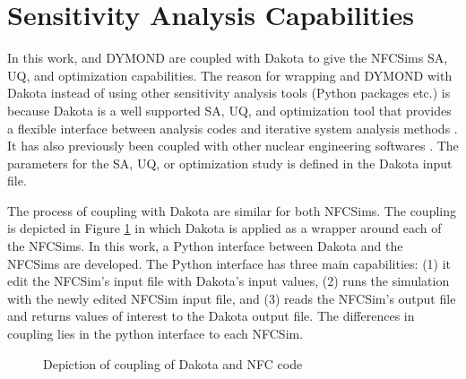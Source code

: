 \section{Sensitivity Analysis Capabilities}
In this work, \Cyclus and DYMOND are coupled with Dakota 
\cite{eldred_dakota_2010} to give the \glspl{NFCSim} \gls{SA}, 
\gls{UQ}, and optimization capabilities. 
The reason for wrapping \Cyclus and DYMOND with Dakota instead of 
using other sensitivity analysis tools (Python packages etc.)
is because Dakota is a well supported \gls{SA}, \gls{UQ}, 
and optimization tool that provides a flexible interface between 
analysis codes and iterative system analysis methods 
\cite{turner_virtual_nodate}. 
It has also previously been coupled with other nuclear engineering 
softwares \cite{turner_virtual_nodate,zhang_uncertainty_nodate}. 
The parameters for the \gls{SA}, \gls{UQ}, or optimization study is defined 
in the Dakota input file. 

The process of coupling with Dakota are similar 
for both \glspl{NFCSim}. 
The coupling is depicted in Figure \ref{fig:dakota-NFC-flow} in which 
Dakota is applied as a wrapper around each of the \glspl{NFCSim}. 
In this work, a Python interface between Dakota and the \glspl{NFCSim}
are developed. 
The Python interface has three main capabilities: 
(1) it edit the \gls{NFCSim}'s input file with Dakota's input values, 
(2) runs the simulation with the newly edited \gls{NFCSim} input file, and 
(3) reads the \gls{NFCSim}'s output file and returns values of interest 
to the Dakota output file. 
The differences in coupling lies in the python interface to each 
\gls{NFCSim}. 

\begin{figure}[]
    \centering
    \caption{Depiction of coupling of Dakota and NFC code}
    \label{fig:dakota-NFC-flow}
\end{figure}

